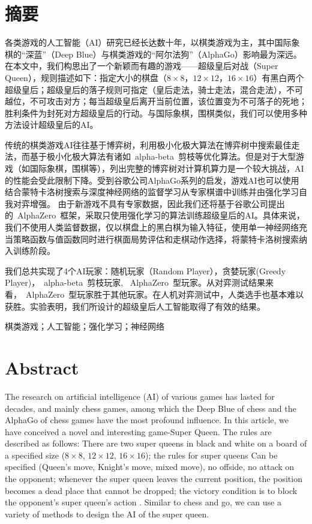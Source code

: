 \chapter*{摘要}

各类游戏的人工智能（AI）研究已经长达数十年，以棋类游戏为主，其中国际象棋的“深蓝”（Deep Blue）与棋类游戏的“阿尔法狗”（AlphaGo）影响最为深远。
在本文中，我们构思出了一个新颖而有趣的游戏——超级皇后对战（Super Queen），规则描述如下：指定大小的棋盘（$8\times8$，$12\times12$，$16\times16$）有黑白两个超级皇后；超级皇后的落子规则可指定（皇后走法，骑士走法，混合走法），不可越位，不可攻击对方；每当超级皇后离开当前位置，该位置变为不可落子的死地；
胜利条件为封死对方超级皇后的行动。与国际象棋，围棋类似，我们可以使用多种方法设计超级皇后的AI。


传统的棋类游戏AI往往基于博弈树，利用极小化极大算法在博弈树中搜索最佳走法，而基于极小化极大算法有诸如~alpha-beta~剪枝等优化算法。但是对于大型游戏（如国际象棋，围棋等），列出完整的博弈树对计算机算力是一个较大挑战，AI的性能会受此限制下降。受到谷歌公司AlphaGo系列的启发，游戏AI也可以使用结合蒙特卡洛树搜索与深度神经网络的监督学习从专家棋谱中训练并由强化学习自我对弈增强。
由于新游戏不具有专家数据，因此我们还将基于谷歌公司提出的~AlphaZero~框架，采取只使用强化学习的算法训练超级皇后的AI。具体来说，我们不使用人类监督数据，仅以棋盘上的黑白棋为输入特征，使用单一神经网络充当策略函数与值函数同时进行棋面局势评估和走棋动作选择，将蒙特卡洛树搜索纳入训练阶段。


我们总共实现了4个AI玩家：随机玩家（Random Player），贪婪玩家(Greedy Player)，~alpha-beta~剪枝玩家, ~AlphaZero~型玩家。从对弈测试结果来看，~AlphaZero~型玩家胜于其他玩家。在人机对弈测试中，人类选手也基本难以获胜。实验表明，我们所设计的超级皇后人工智能取得了有效的结果。

\medskip
{} 棋类游戏；人工智能；强化学习；神经网络

\chapter*{Abstract}

The research on artificial intelligence (AI) of various games has lasted for decades, and mainly chess games, among which the Deep Blue of chess and the AlphaGo of chess games have the most profound influence.
In this article, we have conceived a novel and interesting game-Super Queen. The rules are described as follows: There are two super queens in black and white on a board of a specified size ($8\times8$, $12\times12$, $16\times16$); the rules for super queens Can be specified (Queen's move, Knight's move, mixed move), no offside, no attack on the opponent; whenever the super queen leaves the current position, the position becomes a dead place that cannot be dropped; the victory condition is to block the opponent's super queen's action . Similar to chess and go, we can use a variety of methods to design the AI of the super queen.


